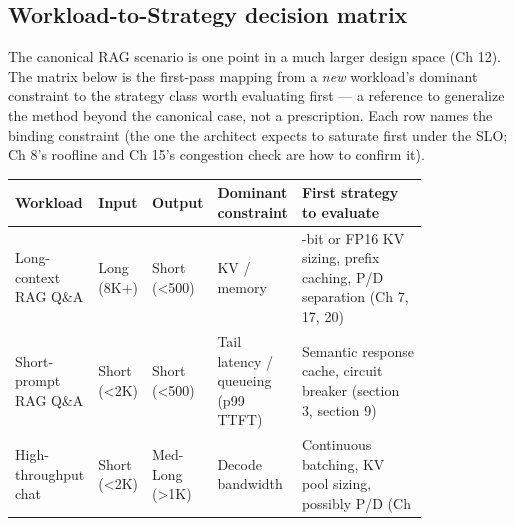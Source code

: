 \subsection{Workload-to-Strategy decision
matrix}\label{workload-to-strategy-decision-matrix}

The canonical RAG scenario is one point in a much larger design space
(Ch 12). The matrix below is the first-pass mapping from a \emph{new}
workload's dominant constraint to the strategy class worth evaluating
first --- a reference to generalize the method beyond the canonical
case, not a prescription. Each row names the binding constraint (the one
the architect expects to saturate first under the SLO; Ch 8's roofline
and Ch 15's congestion check are how to confirm it).

\nopagebreak[4]
\begin{longtable}[]{@{}
  >{\raggedright\arraybackslash}p{0.1164\linewidth}
  >{\raggedright\arraybackslash}p{0.0915\linewidth}
  >{\raggedright\arraybackslash}p{0.0998\linewidth}
  >{\raggedright\arraybackslash}p{0.1830\linewidth}
  >{\raggedright\arraybackslash}p{0.3327\linewidth}@{}}
\toprule\noalign{}
\begin{minipage}[b]{\linewidth}\raggedright
Workload
\end{minipage} & \begin{minipage}[b]{\linewidth}\raggedright
Input
\end{minipage} & \begin{minipage}[b]{\linewidth}\raggedright
Output
\end{minipage} & \begin{minipage}[b]{\linewidth}\raggedright
Dominant constraint
\end{minipage} & \begin{minipage}[b]{\linewidth}\raggedright
First strategy to evaluate
\end{minipage} \\
\midrule\noalign{}
\endhead
\bottomrule\noalign{}
\endlastfoot
Long-context RAG Q\&A & Long (8K+) & Short (\textless500) & KV / memory
& 8-bit or FP16 KV sizing, prefix caching, P/D separation (Ch 7, 17,
20) \\
\noalign{\label{tab:26.4}}
Short-prompt RAG Q\&A & Short (\textless2K) & Short (\textless500) &
Tail latency / queueing (p99 TTFT) & Semantic response cache, circuit
breaker (section 3, section 9) \\
High-throughput chat & Short (\textless2K) & Med-Long (\textgreater1K) &
Decode bandwidth & Continuous batching, KV pool sizing, possibly P/D (Ch

\end{longtable}
